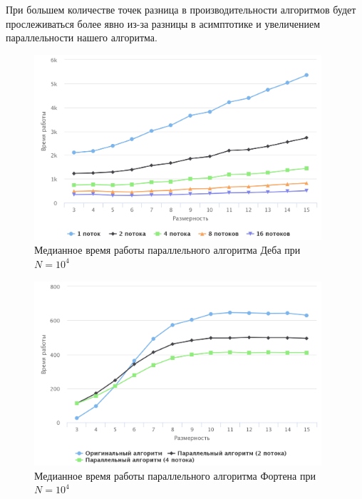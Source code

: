При большем количестве точек разница в производительности алгоритмов будет прослеживаться более явно из-за разницы в асимптотике и увеличением параллельности нашего алгоритма.

\begin{figure}[h!]
\centering
\includegraphics[width=0.95\textwidth]{images/deb10k.png}
\caption{Медианное время работы параллельного алгоритма Деба при $N=10^4$}
\end{figure}

\begin{figure}[h!]
\centering
\includegraphics[width=0.95\textwidth]{images/10k.png}
\caption{Медианное время работы параллельного алгоритма Фортена при $N=10^4$}
\end{figure}

